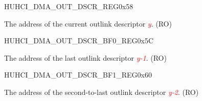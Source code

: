 \begin{register}{H}{UHCI\_DMA\_OUT\_DSCR\_REG}{0x58}\label{regdesc:UHCIDMAOUTDSCRREG}
%
\regnewline%
\begin{regdesc}\begin{reglist}
\item [UHCI\_DMA\_OUT\_DSCR\_REG]The address of the current outlink descriptor \textcolor{red}{\it{y}}. (RO)
\end{reglist}\end{regdesc}
\end{register}


\begin{register}{H}{UHCI\_DMA\_OUT\_DSCR\_BF0\_REG}{0x5C}\label{regdesc:UHCIDMAOUTDSCRBF0REG}
%
\regnewline%
\begin{regdesc}\begin{reglist}
\item [UHCI\_DMA\_OUT\_DSCR\_BF0\_REG]The address of the last outlink descriptor \textcolor{red}{\it{y-1}}. (RO)
\end{reglist}\end{regdesc}
\end{register}


\begin{register}{H}{UHCI\_DMA\_OUT\_DSCR\_BF1\_REG}{0x60}\label{regdesc:UHCIDMAOUTDSCRBF1REG}
%
\regnewline%
\begin{regdesc}\begin{reglist}
\item [UHCI\_DMA\_OUT\_DSCR\_BF1\_REG]The address of the second-to-last outlink descriptor \textcolor{red}{\it{y-2}}. (RO)
\end{reglist}\end{regdesc}
\end{register}


